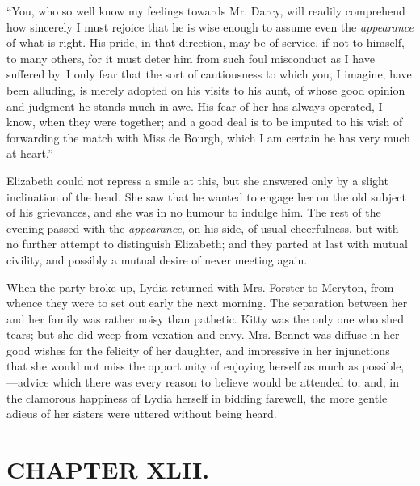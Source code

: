 ``You, who so well know my feelings towards Mr. Darcy, will readily comprehend how sincerely I must rejoice that he is wise enough to assume even the \textit{appearance} of what is right. His pride, in that direction, may be of service, if not to himself, to many others, for it must deter him from such foul misconduct as I have suffered by. I only fear that the sort of cautiousness to which you, I imagine, have been alluding, is merely adopted on his visits to his aunt, of whose good opinion and judgment he stands much in awe. His fear of her has always operated, I know, when they were together; and a good deal is to be imputed to his wish of forwarding the match with Miss de Bourgh, which I am certain he has very much at heart.''

Elizabeth could not repress a smile at this, but she answered only by a slight inclination of the head. She saw that he wanted to engage her on the old subject of his grievances, and she was in no humour to indulge him. The rest of the evening passed with the \textit{appearance}, on his side, of usual cheerfulness, but with no further attempt to distinguish Elizabeth; and they parted at last with mutual civility, and possibly a mutual desire of never meeting again.

When the party broke up, Lydia returned with Mrs. Forster to Meryton, from whence they were to set out early the next morning. The separation between her and her family was rather noisy than pathetic. Kitty was the only one who shed tears; but she did weep from vexation and envy. Mrs. Bennet was diffuse in her good wishes for the felicity of her daughter, and impressive in her injunctions that she would not miss the opportunity of enjoying herself as much as possible,---advice which there was every reason to believe would be attended to; and, in the clamorous happiness of Lydia herself in bidding farewell, the more gentle adieus of her sisters were uttered without being heard.



\chapter{CHAPTER XLII.}

